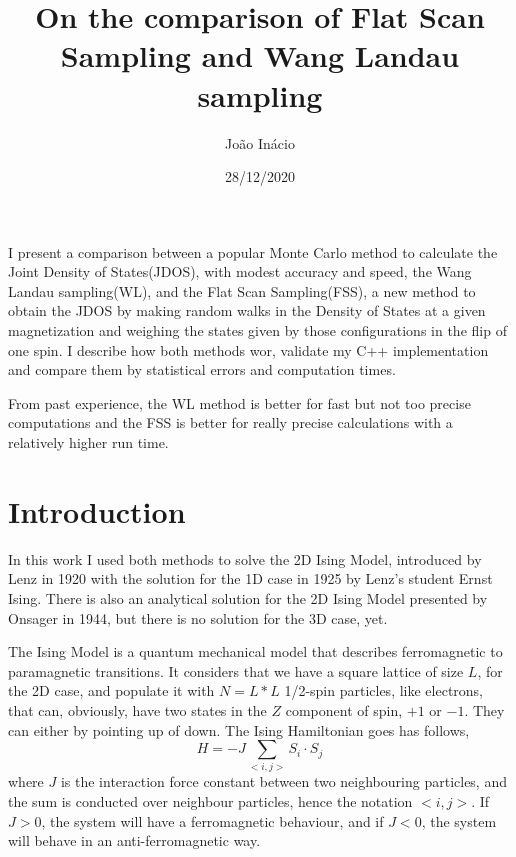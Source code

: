 \documentclass[a4paper, 11pt]{article}
\begin{document}
	\title{\textbf{On the comparison of Flat Scan Sampling and Wang Landau sampling}}
	\author{João Inácio}
	\date{28/12/2020}
	
	\maketitle
	
	
	I present a comparison between a popular Monte Carlo method to  calculate the Joint Density of States(JDOS), with modest accuracy and speed, the Wang Landau sampling(WL), and the Flat Scan Sampling(FSS), a new method to obtain the JDOS by making random walks in the Density of States at a given magnetization and weighing the states given by those configurations in the flip of one spin. I describe how both methods wor, validate my C++ implementation and compare them by statistical errors and computation times.
	
	From past experience, the WL method is better for fast but not too precise computations and the FSS is better for really precise calculations with a relatively higher run time.
	
	\section{Introduction}
	
	In this work I used both methods to solve the 2D Ising Model, introduced by Lenz in 1920 with the solution for the 1D case in 1925 by Lenz's student Ernst Ising. There is also an analytical solution for the 2D Ising Model presented by Onsager in 1944, but there is no solution for the 3D case, yet. 
	
	The Ising Model is a quantum mechanical model that describes ferromagnetic to paramagnetic transitions. It considers that we have a square lattice of size $L$, for the 2D case, and populate it with $N = L * L$ 1/2-spin particles, like electrons, that can, obviously, have two states in the $Z$ component of spin, $+1$ or $-1$. They can either by pointing up of down. The Ising Hamiltonian goes has follows,
	\begin{equation*}
		H=-J\sum_{<i,j>}S_i \cdot S_j
	\end{equation*}
	where $J$ is the interaction force constant between two neighbouring particles, and the sum is conducted over neighbour particles, hence the notation $<i,j>$. If $J>0$, the system will have a ferromagnetic behaviour, and if $J<0$, the system will behave in an anti-ferromagnetic way.
	
\end{document}
